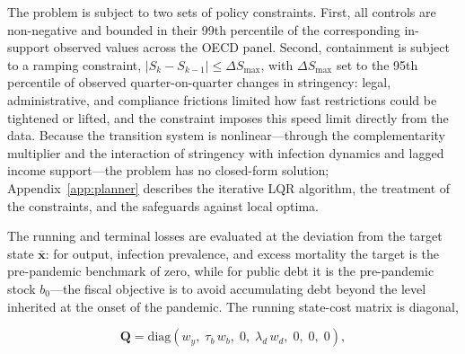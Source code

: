 \documentclass[12pt, a4paper]{article}
\begin{document}
The problem is subject to two sets of policy
constraints. First, all controls are non-negative and bounded in their 99th percentile of the
corresponding in-support observed values across the OECD panel. Second, containment is subject to a ramping constraint, \(|S_k - S_{k-1}| \le \Delta S_{\max}\), with \(\Delta S_{\max}\) set to the 95th percentile of observed quarter-on-quarter changes in stringency: legal, administrative, and compliance frictions limited how fast restrictions could be tightened or lifted, and the constraint imposes this speed limit directly from the data. Because the transition system is nonlinear---through the complementarity multiplier and the interaction of
stringency with infection dynamics and lagged income support---the problem has no
closed-form solution; Appendix~\ref{app:planner} describes the iterative LQR algorithm,
the treatment of the constraints, and the safeguards against local optima.

The running and terminal losses are evaluated at the deviation from the target state
\(\bar{\bm{x}}\): for output, infection prevalence, and excess mortality the target is the
pre-pandemic benchmark of zero, while for public debt it is the pre-pandemic stock
\(b_0\)---the fiscal objective is to avoid accumulating debt beyond the level inherited at
the onset of the pandemic. The running state-cost matrix is diagonal,

\begin{equation}
  \bm{Q} = \mathrm{diag}\!\left(w_y,\; \tau_b\, w_b,\; 0,\; \lambda_d\, w_d,\; 0,\; 0,\; 0\right),
  \label{eq:Qmatrix}
\end{equation}
\end{document}
